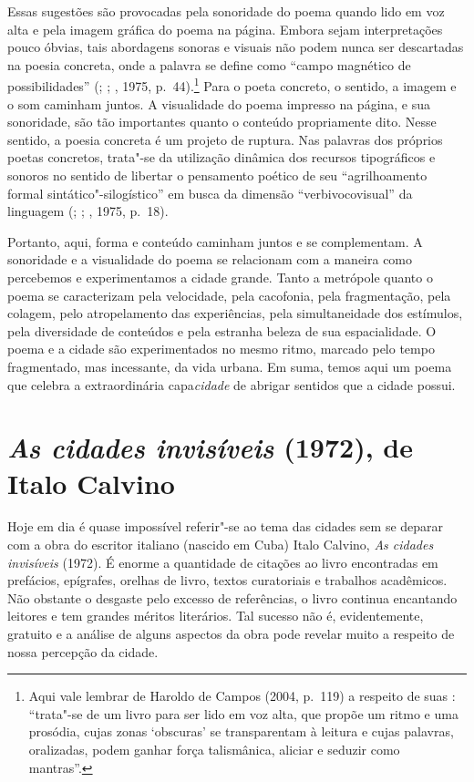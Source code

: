 Essas sugestões são provocadas pela sonoridade do poema quando lido em
voz alta e pela imagem gráfica do poema na página. Embora sejam
interpretações pouco óbvias, tais abordagens sonoras e visuais não podem
nunca ser descartadas na poesia concreta, onde a palavra se define como
``campo magnético de possibilidades'' (; ; , 1975,
p.~44).\footnote{Aqui vale lembrar de Haroldo de Campos (2004, p.~119) a
  respeito de suas {}: ``trata"-se de um livro para ser lido
  em voz alta, que propõe um ritmo e uma prosódia, cujas zonas
  `obscuras' se transparentam à leitura e cujas palavras, oralizadas,
  podem ganhar força talismânica, aliciar e seduzir como mantras''.}
Para o poeta concreto, o sentido, a imagem e o som caminham juntos. A
visualidade do poema impresso na página, e sua sonoridade, são tão
importantes quanto o conteúdo propriamente dito. Nesse sentido, a poesia
concreta é um projeto de ruptura. Nas palavras dos próprios poetas
concretos, trata"-se da utilização dinâmica dos recursos tipográficos e
sonoros no sentido de libertar o pensamento poético de seu
``agrilhoamento formal sintático"-silogístico'' em busca da dimensão
``verbivocovisual'' da linguagem (; ; , 1975, p.~18).

Portanto, aqui, forma e conteúdo caminham juntos e se complementam. A
sonoridade e a visualidade do poema se relacionam com a maneira como
percebemos e experimentamos a cidade grande. Tanto a metrópole quanto o
poema se caracterizam pela velocidade, pela cacofonia, pela
fragmentação, pela colagem, pelo atropelamento das experiências, pela
simultaneidade dos estímulos, pela diversidade de conteúdos e pela
estranha beleza de sua espacialidade. O poema e a cidade são
experimentados no mesmo ritmo, marcado pelo tempo fragmentado, mas
incessante, da vida urbana. Em suma, temos aqui um poema que celebra a
extraordinária capa\emph{cidade} de abrigar sentidos que a cidade
possui.

\chapter{\emph{As cidades invisíveis} (1972), de Italo Calvino}

Hoje em dia é quase impossível referir"-se ao tema das cidades sem se
deparar com a obra do escritor italiano (nascido em Cuba) Italo Calvino,
\emph{As cidades invisíveis} (1972). É enorme a quantidade de citações
ao livro encontradas em prefácios, epígrafes, orelhas de livro, textos
curatoriais e trabalhos acadêmicos. Não obstante o desgaste pelo excesso
de referências, o livro continua encantando leitores e tem grandes
méritos literários. Tal sucesso não é, evidentemente, gratuito e a
análise de alguns aspectos da obra pode revelar muito a respeito de
nossa percepção da cidade.

